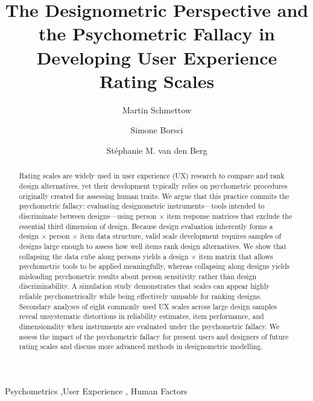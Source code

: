 \documentclass[
  authoryear,
  review]{elsarticle}
\begin{document}
\begin{frontmatter}
\title{The Designometric Perspective and the Psychometric Fallacy in
Developing User Experience Rating Scales}
\author[1]{Martin Schmettow%
%
}
\author[1]{Simone Borsci%
%
}
\author[1]{Stéphanie M. van den Berg%
%
}





        
\begin{abstract}
Rating scales are widely used in user experience (UX) research to
compare and rank design alternatives, yet their development typically
relies on psychometric procedures originally created for assessing human
traits. We argue that this practice commits the psychometric fallacy:
evaluating designometric instruments---tools intended to discriminate
between designs---using person × item response matrices that exclude the
essential third dimension of design. Because design evaluation
inherently forms a design × person × item data structure, valid scale
development requires samples of designs large enough to assess how well
items rank design alternatives. We show that collapsing the data cube
along persons yields a design × item matrix that allows psychometric
tools to be applied meaningfully, whereas collapsing along designs
yields misleading psychometric results about person sensitivity rather
than design discriminability. A simulation study demonstrates that
scales can appear highly reliable psychometrically while being
effectively unusable for ranking designs. Secondary analyses of eight
commonly used UX scales across large design samples reveal unsystematic
distortions in reliability estimates, item performance, and
dimensionality when instruments are evaluated under the psychometric
fallacy. We assess the impact of the psychometric fallacy for present
users and designers of future rating scales and discuss more advanced
methods in designometric modelling.
\end{abstract}





\begin{keyword}
    Psychometrics \sep User Experience \sep 
    Human Factors
\end{keyword}
\end{frontmatter}
    
\end{document}
